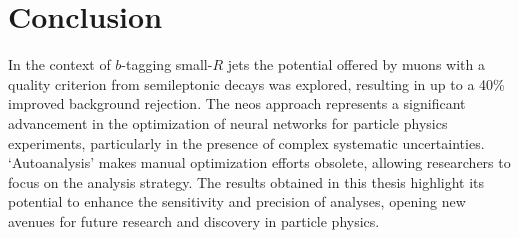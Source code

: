 


\section{Conclusion}
In the context of $b$-tagging small-$R$ jets the potential offered by muons with a quality criterion from semileptonic decays was explored, resulting in up to a 40\% improved background rejection. The \ac{neos} approach represents a significant advancement in the optimization of neural networks for particle physics experiments, particularly in the presence of complex systematic uncertainties. `Autoanalysis' makes manual optimization efforts obsolete, allowing researchers to focus on the analysis strategy. The results obtained in this thesis highlight its potential to enhance the sensitivity and precision of analyses, opening new avenues for future research and discovery in particle physics.






